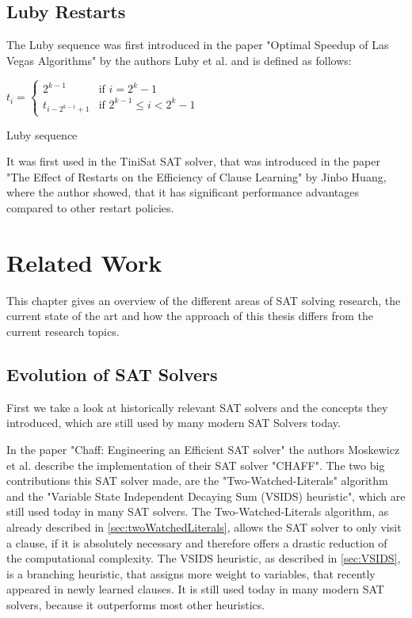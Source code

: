 \section{Luby Restarts}

The Luby sequence was first introduced in the paper "Optimal Speedup of Las Vegas Algorithms" \cite{luby1993optimal} by the authors Luby et al. and is defined as follows:

\begin{definition}
\centering
\begin{leftbar}
$t_i =
\begin{cases}
  2^{k-1} & \text{if } i = 2^k - 1   \\
  t_{i-2^{k-1}+1} & \text{if } 2^{k-1} \leq i < 2^k - 1
\end{cases}$
\end{leftbar}
\caption{Luby sequence \cite{luby1993optimal}}
\end{definition}

It was first used in the TiniSat SAT solver, that was introduced in the paper "The Effect of Restarts on the Efficiency of Clause Learning" \cite{huang2007effect} by Jinbo Huang, where the author showed, that it has significant performance advantages compared to other restart policies.

\chapter{Related Work}
\label{ch:Related Work}

This chapter gives an overview of the different areas of SAT solving research, the current state of the art and how the approach of this thesis differs from the current research topics.

\section{Evolution of SAT Solvers}
First we take a look at historically relevant SAT solvers and the concepts they introduced, which are still used by many modern SAT Solvers today.

In the paper "Chaff: Engineering an Efficient SAT solver" \cite{moskewicz2001chaff} the authors Moskewicz et al. describe the implementation of their SAT solver "CHAFF". The two big contributions this SAT solver made, are the "Two-Watched-Literals" algorithm and the "Variable State Independent Decaying Sum (VSIDS) heuristic", which are still used today in many SAT solvers. The Two-Watched-Literals algorithm, as already described in \ref{sec:twoWatchedLiterals}, allows the SAT solver to only visit a clause, if it is absolutely necessary and therefore offers a drastic reduction of the computational complexity. The VSIDS heuristic, as described in \ref{sec:VSIDS}, is a branching heuristic, that assigns more weight to variables, that recently appeared in newly learned clauses. It is still used today in many modern SAT solvers, because it outperforms most other heuristics.

